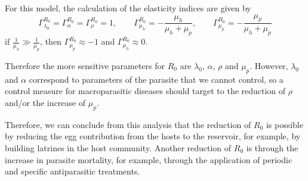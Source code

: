 \documentclass[12pt,a4paper]{article}
\theoremstyle{plain}%
\theoremstyle{definition}
\theoremstyle{remark}
\begin{document}
		For this model, the calculation of the elasticity indices are given by	
		\begin{equation}
		\Gamma^{R_0}_{\lambda_0}=\Gamma^{R_0}_{\alpha}=\Gamma^{R_0}_{\rho}=1, 
		\qquad \Gamma^{R_0}_{\mu_h}=-\dfrac{\mu_h}{\mu_{h}+\mu_p},
		\qquad \Gamma^{R_0}_{\mu_p}=-\dfrac{\mu_p}{\mu_{h}+\mu_p}
		\end{equation}
		if $\frac{1}{\mu_h} \gg \frac{1}{\mu_p}$, then $\Gamma^{R_0}_{\mu_p}\approx -1$
		and 
		$\Gamma^{R_0}_{\mu_h}\approx 0$.
		
		Therefore the more sensitive parameters for $R_0$ are $\lambda_0$, $\alpha$, $\rho$ and $\mu_p$.
		However, $\lambda_0$ and $\alpha$ correspond to parameters of the parasite that we cannot control, so a control measure for macroparasitic diseases should target to the reduction of $\rho$ and/or the increase of $\mu_p$.
		
		Therefore, we can conclude from this analysis that the reduction of $R_0$ 
		is possible by reducing
		the egg contribution from the hosts to the reservoir, for example, by building latrines in the host community.
		Another reduction of $R_0$ is through the increase in parasite mortality, for example, through the application of periodic and specific antiparasitic treatments.
		



		
\end{document}
